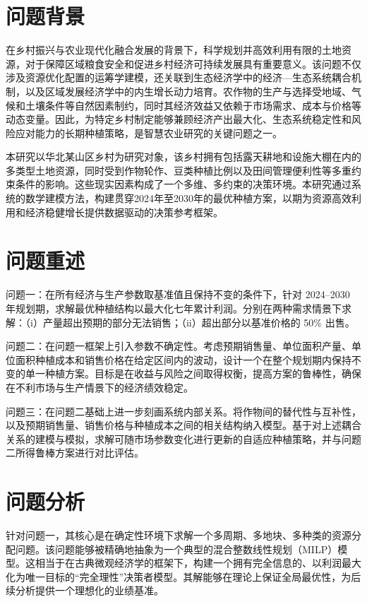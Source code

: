 
\section{问题背景}

在乡村振兴与农业现代化融合发展的背景下，科学规划并高效利用有限的土地资源，对于保障区域粮食安全和促进乡村经济可持续发展具有重要意义。该问题不仅涉及资源优化配置的运筹学建模，还关联到生态经济学中的经济—生态系统耦合机制，以及区域发展经济学中的内生增长动力培育。农作物的生产与选择受地域、气候和土壤条件等自然因素制约，同时其经济效益又依赖于市场需求、成本与价格等动态变量。因此，为特定乡村制定能够兼顾经济产出最大化、生态系统稳定性和风险应对能力的长期种植策略，是智慧农业研究的关键问题之一。

本研究以华北某山区乡村为研究对象，该乡村拥有包括露天耕地和设施大棚在内的多类型土地资源，同时受到作物轮作、豆类种植比例以及田间管理便利性等多重约束条件的影响。这些现实因素构成了一个多维、多约束的决策环境。本研究通过系统的数学建模方法，构建贯穿2024年至2030年的最优种植方案，以期为资源高效利用和经济稳健增长提供数据驱动的决策参考框架。


\section{问题重述}

问题一：在所有经济与生产参数取基准值且保持不变的条件下，针对 2024–2030 年规划期，求解最优种植结构以最大化七年累计利润。分别在两种需求情景下求解：（i）产量超出预期的部分无法销售；（ii）超出部分以基准价格的 50\% 出售。

问题二：在问题一框架上引入参数不确定性。考虑预期销售量、单位面积产量、单位面积种植成本和销售价格在给定区间内的波动，设计一个在整个规划期内保持不变的单一种植方案。目标是在收益与风险之间取得权衡，提高方案的鲁棒性，确保在不利市场与生产情景下的经济绩效稳定。

问题三：在问题二基础上进一步刻画系统内部关系。将作物间的替代性与互补性，以及预期销售量、销售价格与种植成本之间的相关结构纳入模型。基于对上述耦合关系的建模与模拟，求解可随市场参数变化进行更新的自适应种植策略，并与问题二所得鲁棒方案进行对比评估。


\section{问题分析}

针对问题一，其核心是在确定性环境下求解一个多周期、多地块、多种类的资源分配问题。该问题能够被精确地抽象为一个典型的混合整数线性规划（MILP）模型。这相当于在古典微观经济学的框架下，构建一个拥有完全信息的、以利润最大化为唯一目标的“完全理性”决策者模型。其解能够在理论上保证全局最优性，为后续分析提供一个理想化的业绩基准。

